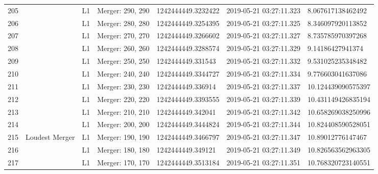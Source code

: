 \begin{longtable}{lllllll}
205  &                                                    &       L1 &  Merger: 290, 290 &  1242444449.3232422 &  2019-05-21 03:27:11.323 &   8.067617138462492 \\
206  &                                                    &       L1 &  Merger: 280, 280 &  1242444449.3254395 &  2019-05-21 03:27:11.325 &   8.346097920113852 \\
207  &                                                    &       L1 &  Merger: 270, 270 &  1242444449.3266602 &  2019-05-21 03:27:11.327 &   8.735785970397268 \\
208  &                                                    &       L1 &  Merger: 260, 260 &  1242444449.3288574 &  2019-05-21 03:27:11.329 &    9.14186427941374 \\
209  &                                                    &       L1 &  Merger: 250, 250 &   1242444449.331543 &  2019-05-21 03:27:11.332 &   9.531025235348482 \\
210  &                                                    &       L1 &  Merger: 240, 240 &  1242444449.3344727 &  2019-05-21 03:27:11.334 &   9.776603041637086 \\
211  &                                                    &       L1 &  Merger: 230, 230 &   1242444449.336914 &  2019-05-21 03:27:11.337 &  10.124439090575397 \\
212  &                                                    &       L1 &  Merger: 220, 220 &  1242444449.3393555 &  2019-05-21 03:27:11.339 &  10.431149426835194 \\
213  &                                                    &       L1 &  Merger: 210, 210 &   1242444449.342041 &  2019-05-21 03:27:11.342 &  10.658269038250996 \\
214  &                                                    &       L1 &  Merger: 200, 200 &  1242444449.3444824 &  2019-05-21 03:27:11.344 &  10.824408590528051 \\
215  &                                     Loudest Merger &       L1 &  Merger: 190, 190 &  1242444449.3466797 &  2019-05-21 03:27:11.347 &   10.89012776147467 \\
216  &                                                    &       L1 &  Merger: 180, 180 &   1242444449.349121 &  2019-05-21 03:27:11.349 &  10.826563562963305 \\
217  &                                                    &       L1 &  Merger: 170, 170 &  1242444449.3513184 &  2019-05-21 03:27:11.351 &  10.768320723140551 \\

\end{longtable}
